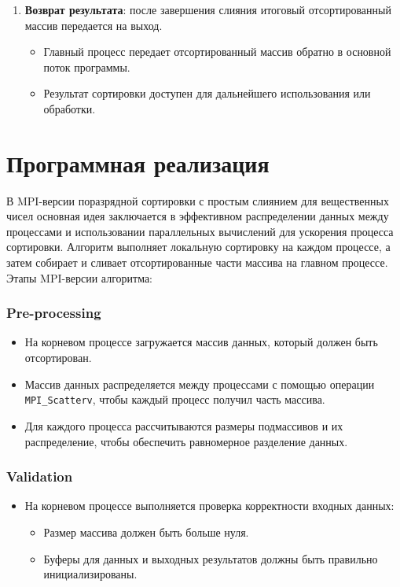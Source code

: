 \documentclass[12pt]{article}
\begin{document}
\begin{enumerate}
    \item \textbf{Возврат результата}: после завершения слияния итоговый отсортированный массив передается на выход.
    \begin{itemize}
        \item Главный процесс передает отсортированный массив обратно в основной поток программы.
        \item Результат сортировки доступен для дальнейшего использования или обработки.
    \end{itemize}
\end{enumerate}

\newpage

\section*{Программная реализация}

\hspace*{1.25em}В MPI-версии поразрядной сортировки с простым слиянием для вещественных чисел основная идея заключается в эффективном распределении данных между процессами и использовании параллельных вычислений для ускорения процесса сортировки. Алгоритм выполняет локальную сортировку на каждом процессе, а затем собирает и сливает отсортированные части массива на главном процессе. Этапы MPI-версии алгоритма:

\subsubsection*{Pre-processing}
\begin{itemize}
    \item На корневом процессе загружается массив данных, который должен быть отсортирован.
    \item Массив данных распределяется между процессами с помощью операции \texttt{MPI\_Scatterv}, чтобы каждый процесс получил часть массива.
    \item Для каждого процесса рассчитываются размеры подмассивов и их распределение, чтобы обеспечить равномерное разделение данных.
\end{itemize}

\subsubsection*{Validation}
\begin{itemize}
    \item На корневом процессе выполняется проверка корректности входных данных:
    \begin{itemize}
        \item Размер массива должен быть больше нуля.
        \item Буферы для данных и выходных результатов должны быть правильно инициализированы.
    \end{itemize}
\end{itemize}
\end{document}
